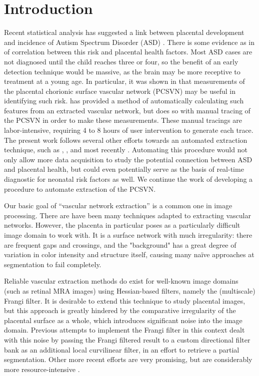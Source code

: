 \chapter{Introduction} \label{ch:introduction}

Recent statistical analysis has suggested a link between placental development and incidence of
Autism Spectrum Disorder (ASD) \cite{chang2017}. There is some evidence as in \cite{chang2016whole}
of correlation between this risk and placental health factors. Most ASD
cases are not diagnosed until the child reaches three or four, so the benefit
of an early detection technique would be massive, as the brain may be more
receptive to treatment at a young age. In particular, it was shown in
\cite{chang2016whole} that measurements of the placental chorionic surface
vascular network (PCSVN) may be useful in identifying such risk.
\cite{chang2017} has provided a method of automatically calculating such
features from an extracted vascular network, but does so with manual tracing of
the PCSVN in order to make these measurements.  These manual tracings are
labor-intensive, requiring 4 to 8 hours of user intervention to generate each trace.
The present work follows several other efforts towards an automated extraction
technique, such as \cite{almoussa-ucla-reu}, \cite{huynh2013filter}, and
most recently \cite{djima2017enhancing}. Automating this procedure would not
only allow more data acquisition to study the potential connection between ASD
and placental health, but could even potentially serve as the basis of real-time
diagnostic for neonatal risk factors as well. We continue the work of
developing a procedure to automate extraction of the PCSVN.


Our basic goal of ``vascular network extraction'' is a common one in image
processing. There are have been many techniques adapted to extracting vascular
networks. However, the placenta in particular poses as a particularly difficult
image domain to work with. It is a surface network with much irregularity: there are
frequent gaps and crossings, and the "background" has a great degree of variation in
color intensity and structure itself, causing many na\"{i}ve
approaches at segmentation to fail completely.

Reliable vascular extraction methods do exist for well-known image domains
(such as retinal MRA images) using Hessian-based filters, namely the (multiscale) Frangi filter.
It is desirable to extend this technique to study placental images, but this
approach is greatly hindered by the comparative irregularity of the placental
surface as a whole, which introduces significant noise into the image domain.
Previous attempts to implement the Frangi filter in this context \cite{huynh2013filter}
dealt with this noise by passing the Frangi filtered result to a custom directional filter bank
as an additional local curvilinear filter, in an effort to retrieve a partial
segmentation. Other more recent efforts are very promising,
but are considerably more resource-intensive \cite{djima2017enhancing}.

